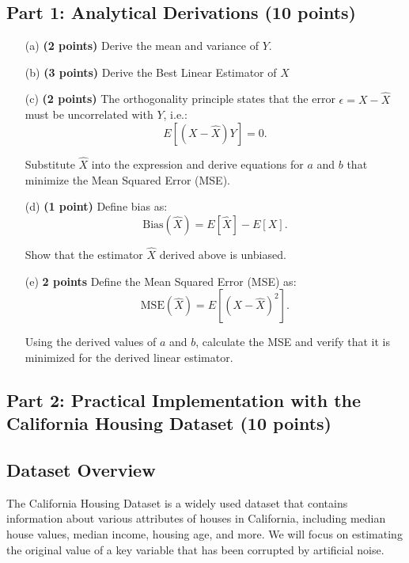 \documentclass{article}
\begin{document}
\subsection*{Part 1: Analytical Derivations (10 points)}
\begin{enumerate}
    \item[(a)] \textbf{(2 points)} Derive the mean and variance of \(Y\).

    \item[(b)] \textbf{(3 points)} Derive the Best Linear Estimator of \( X \)

    \item[(c)] \textbf{(2 points)} The orthogonality principle states that the error \( \epsilon = X - \hat{X} \) must be uncorrelated with \( Y \), i.e.:
    \[
    E[(X - \hat{X})Y] = 0.
    \]
    
    Substitute \( \hat{X} \) into the expression and derive equations for \( a \) and \( b \) that minimize the Mean Squared Error (MSE).

    \item[(d)] \textbf{(1 point)} Define bias as:
    \[
    \text{Bias}(\hat{X}) = E[\hat{X}] - E[X].
    \]
    
    Show that the estimator \( \hat{X} \) derived above is unbiased.

    \item[(e)] \textbf{2 points} Define the Mean Squared Error (MSE) as:
    \[
    \text{MSE}(\hat{X}) = E[(X - \hat{X})^2].
    \]
    
    Using the derived values of \( a \) and \( b \), calculate the MSE and verify that it is minimized for the derived linear estimator. 
\end{enumerate}

\subsection*{Part 2: Practical Implementation with the California Housing Dataset (10 points)}

\subsection*{Dataset Overview}
The California Housing Dataset is a widely used dataset that contains information about various attributes of houses in California, including median house values, median income, housing age, and more. We will focus on estimating the original value of a key variable that has been corrupted by artificial noise.
\end{document}
